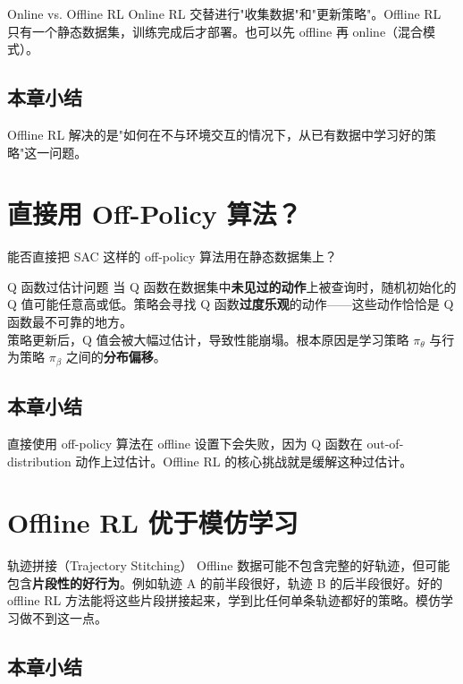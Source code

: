 \documentclass[a4paper]{article}
\begin{document}
\begin{knowledgebox}{Online vs. Offline RL}
Online RL 交替进行"收集数据"和"更新策略"。Offline RL 只有一个静态数据集，训练完成后才部署。也可以先 offline 再 online（混合模式）。
\end{knowledgebox}

\subsection{本章小结}

Offline RL 解决的是"如何在不与环境交互的情况下，从已有数据中学习好的策略"这一问题。

\section{直接用 Off-Policy 算法？}

能否直接把 SAC 这样的 off-policy 算法用在静态数据集上？

\begin{warningbox}{Q 函数过估计问题}
当 Q 函数在数据集中\textbf{未见过的动作}上被查询时，随机初始化的 Q 值可能任意高或低。策略会寻找 Q 函数\textbf{过度乐观}的动作——这些动作恰恰是 Q 函数最不可靠的地方。
\\[6pt]
策略更新后，Q 值会被大幅过估计，导致性能崩塌。根本原因是学习策略 $\pi_\theta$ 与行为策略 $\pi_\beta$ 之间的\textbf{分布偏移}。
\end{warningbox}

\subsection{本章小结}

直接使用 off-policy 算法在 offline 设置下会失败，因为 Q 函数在 out-of-distribution 动作上过估计。Offline RL 的核心挑战就是缓解这种过估计。

\section{Offline RL 优于模仿学习}

\begin{importantbox}{轨迹拼接（Trajectory Stitching）}
Offline 数据可能不包含完整的好轨迹，但可能包含\textbf{片段性的好行为}。例如轨迹 A 的前半段很好，轨迹 B 的后半段很好。好的 offline RL 方法能将这些片段拼接起来，学到比任何单条轨迹都好的策略。模仿学习做不到这一点。
\end{importantbox}

\subsection{本章小结}
\end{document}
